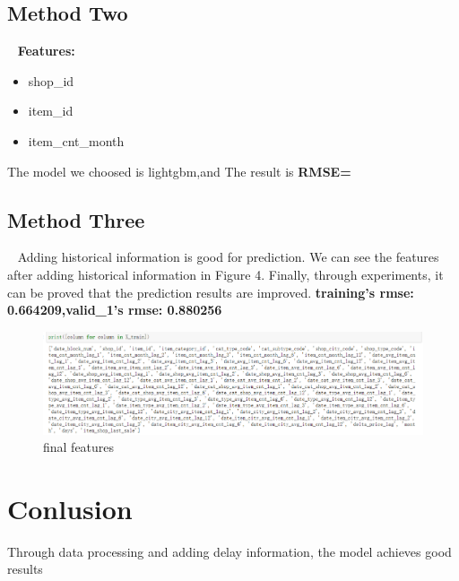 \subsection{Method Two}
\ 
\newline
\textbf{Features:}\par
  \begin{itemize}
    \item shop_id
    \item item_id
    \item item_cnt_month
  \end{itemize}
  The model we choosed is lightgbm,and The result is \textbf{RMSE=}

\subsection{Method Three}\par
\ 
\newline
Adding historical information is good for prediction. We can see the features after adding historical information in Figure 4.
Finally, through experiments, it can be proved that the prediction results are improved.
\textbf{training's rmse: 0.664209,valid_1's rmse: 0.880256}
\begin{figure}
    \includegraphics[scale=0.3]{picture/data_16.eps}
    \caption{final features}\label{fig:4}
\end{figure}
\section{Conlusion}
Through data processing and adding delay information, the model achieves good results